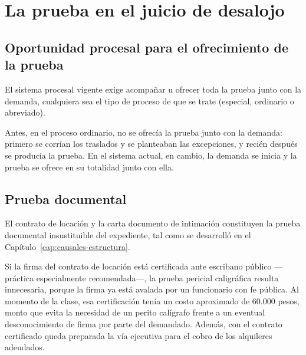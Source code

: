 \documentclass[12pt,oneside]{book}
\begin{document}
\chapter{La prueba en el juicio de desalojo}
\label{cap:prueba}

\section{Oportunidad procesal para el ofrecimiento de la prueba}

El sistema procesal vigente exige acompañar u ofrecer toda la prueba junto con la demanda, cualquiera sea el tipo de proceso de que se trate (especial, ordinario o abreviado).

\begin{note}
Antes, en el proceso ordinario, no se ofrecía la prueba junto con la demanda: primero se corrían los traslados y se planteaban las excepciones, y recién después se producía la prueba. En el sistema actual, en cambio, la demanda se inicia y la prueba se ofrece en su totalidad junto con ella.
\end{note}


\section{Prueba documental}

El contrato de locación y la carta documento de intimación constituyen la prueba documental insustituible del expediente, tal como se desarrolló en el Capítulo~\ref{cap:causales-estructura}.

\begin{important}
Si la firma del contrato de locación está certificada ante escribano público ---práctica especialmente recomendada---, la prueba pericial caligráfica resulta innecesaria, porque la firma ya está avalada por un funcionario con fe pública. Al momento de la clase, esa certificación tenía un costo aproximado de 60.000 pesos, monto que evita la necesidad de un perito calígrafo frente a un eventual desconocimiento de firma por parte del demandado. Además, con el contrato certificado queda preparada la vía ejecutiva para el cobro de los alquileres adeudados.
\end{important}
\end{document}
